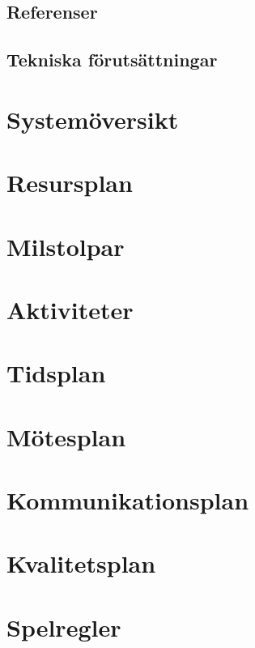 \documentclass{article}
\begin{document}
\subsection{Referenser}

\subsection{Tekniska förutsättningar}

\section{Systemöversikt}

\section{Resursplan}

\section{Milstolpar}

\section{Aktiviteter}

\section{Tidsplan}

\section{Mötesplan}

\section{Kommunikationsplan}

\section{Kvalitetsplan}

\section{Spelregler}
\end{document}

